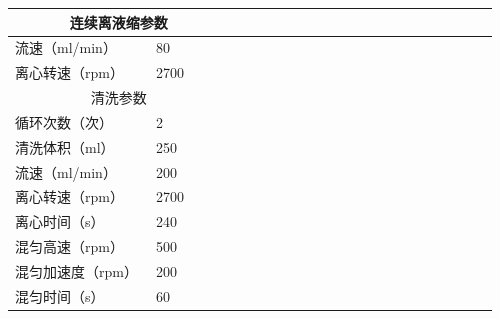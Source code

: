 \documentclass[UTF8,10pt,a4paper,fontset=fandol]{ctexart}
\newcommand{\fieldvalue}[1]{#1}
\begin{document}
\begin{center}
\begin{tabular}{|p{0.28\linewidth}|p{0.16\linewidth}|p{0.34\linewidth}|p{0.18\linewidth}|}
\hline
\multicolumn{2}{|c|}{连续离液缩参数} & \multicolumn{2}{c|}{}\\
\hline
流速（ml/min） &
\fieldvalue{80}
&
&
\\
\hline
离心转速（rpm） &
\fieldvalue{2700}
&
&
\\
\hline
\multicolumn{2}{|c|}{清洗参数} & \multicolumn{2}{c|}{}\\
\hline
循环次数（次） &
\fieldvalue{2}
&
&
\\
\hline
清洗体积（ml） &
\fieldvalue{250}
&
&
\\
\hline
流速（ml/min） &
\fieldvalue{200}
&
&
\\
\hline
离心转速（rpm） &
\fieldvalue{2700}
&
&
\\
\hline
离心时间（s） &
\fieldvalue{240}
&
&
\\
\hline
混匀高速（rpm） &
\fieldvalue{500}
&
&
\\
\hline
混匀加速度（rpm） &
\fieldvalue{200}
&
&
\\
\hline
混匀时间（s） &
\fieldvalue{60}
&
&
\\
\hline
\end{tabular}

\vspace{0.3em}


\end{center}
\end{document}
